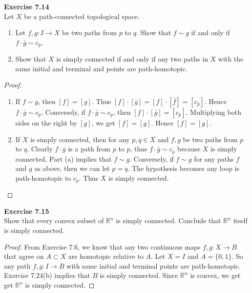 \documentclass[12pt, a4paper]{article}
\theoremstyle{plain}
\newcommand{\R}{\mathbb{R}}
\newenvironment{exercise}[2][Exercise]
    { \begin{mdframed}[backgroundcolor=gray!20] \textbf{#1 #2} \\}
    {  \end{mdframed}}
\begin{document}
\begin{exercise}{7.14}
    Let $X$ be a path-connected topological space.
    \begin{enumerate}[label=(\alph*)]
        \item Let $f,g\colon I\to X$ be two paths from $p$ to $q$. Show that $f\sim g$ if and only if $f\cdot \bar g\sim c_p$.
        \item Show that $X$ is simply connected if and only if any two paths in $X$ with the same initial and terminal and points are path-homotopic.
    \end{enumerate}
\end{exercise}
    \begin{proof}
        \hfill
        \begin{enumerate}[label=(\alph*)]
            \item If $f\sim g$, then $[f]=[g]$. Thus $[f]\cdot [\bar g] = [f]\cdot [\bar f]=[c_p]$. Hence $f\cdot \bar g \sim c_p$. Conversely, if $f\cdot \bar g \sim c_p$, then $[f]\cdot [\bar g]=[c_p]$. Multiplying both sides on the right by $[g]$, we get $[f]=[g]$. Hence $[f]=[g]$.
            \item If $X$ is simply connected, then for any $p,q\in X$ and $f,g$ be two paths from $p$ to $q$. Clearly $f\cdot \bar g$ is a path from $p$ to $p$, thus $f\cdot \bar g\sim c_p$ because $X$ is simply connected. Part (a) implies that $f\sim g$. Conversely, if $f\sim g$ for any paths $f$ and $g$ as above, then we can let $p=q$. The hypothesis becomes any loop is path-homotopic to $c_p$. Thus $X$ is simply connected.
        \end{enumerate}
    \end{proof}


\begin{exercise}{7.15}
    Show that every convex subset of $\R^n$ is simply connected. Conclude that $\R^n$ itself is simply connected.
\end{exercise}
    \begin{proof}
        From Exercise 7.6, we know that any two continuous maps $f,g\colon X\to B$ that agree on $A\subset X$ are homotopic relative to $A$. Let $X=I$ and $A=\{0,1\}$. So any path $f,g\colon I\to B$ with same initial and terminal points are path-homotopic. Exercise 7.24(b) implies that $B$ is simply connected. Since $\R^n$ is convex, we get get $\R^n$ is simply connected.
    \end{proof}
\end{document}
